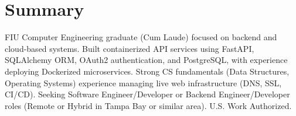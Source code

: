 \section{Summary}
\small{FIU Computer Engineering graduate (Cum Laude) focused on backend and cloud-based systems. 
Built containerized API services using FastAPI, SQLAlchemy ORM, OAuth2 authentication, 
and PostgreSQL, with experience deploying Dockerized microservices. 
Strong CS fundamentals (Data Structures, Operating Systems) experience managing live web infrastructure (DNS, SSL, CI/CD). Seeking Software Engineer/Developer 
or Backend Engineer/Developer roles (Remote or Hybrid in Tampa Bay or similar area). U.S. Work Authorized.}
\vspace{-6pt}
